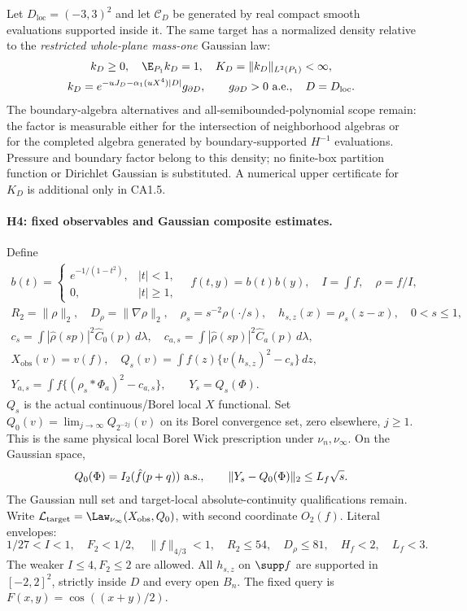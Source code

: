 Let $D_{\mathrm{loc}}=(-3,3)^2$ and let $\mathcal C_D$ be generated by real
compact smooth evaluations supported inside it. The same target has a
normalized density relative to the \emph{restricted whole-plane mass-one}
Gaussian law:
\begin{gather*}
 k_D\ge0,\quad \E_{P_1}k_D=1,\quad K_D=\|k_D\|_{L^2(P_1)}<\infty,\\
 k_D=e^{-uJ_D-\alpha_1(uX^4)|D|}g_{\partial D},\qquad
 g_{\partial D}>0\ \hbox{a.e.},\quad D=D_{\mathrm{loc}}.
\end{gather*}
The boundary-algebra alternatives and all-semibounded-polynomial scope
remain: the factor is measurable either for the intersection of neighborhood
algebras or for the completed algebra generated by boundary-supported
$H^{-1}$ evaluations. Pressure and boundary factor belong to this density;
no finite-box partition function or Dirichlet Gaussian is substituted.
A numerical upper certificate for $K_D$ is additional only in CA1.5.

\paragraph{H4: fixed observables and Gaussian composite estimates.}
Define
\begin{gather*}
 b(t)=\begin{cases}e^{-1/(1-t^2)},&|t|<1,\\0,&|t|\ge1,\end{cases}\quad
 f(t,y)=b(t)b(y),\quad I=\int f,\quad\rho=f/I,\\
 R_2=\|\rho\|_2,\quad D_\rho=\|\nabla\rho\|_2,\quad
 \rho_s=s^{-2}\rho(\cdot/s),\quad h_{s,z}(x)=\rho_s(z-x),\quad0<s\le1,\\
 c_s=\int|\hat\rho(sp)|^2\hat C_0(p)\,d\lambda,\quad
 c_{a,s}=\int|\hat\rho(sp)|^2\hat C_a(p)\,d\lambda,\\
 X_{\mathrm{obs}}(v)=v(f),\quad
 Q_s(v)=\int f(z)\{v(h_{s,z})^2-c_s\}\,dz,\\
 Y_{a,s}=\int f\{(\rho_s*\Phi_a)^2-c_{a,s}\},\qquad Y_s=Q_s(\Phi).
\end{gather*}
$Q_s$ is the actual continuous/Borel local $X$ functional. Set
$Q_0(v)=\lim_{j\to\infty}Q_{2^{-2j}}(v)$ on its Borel convergence set,
zero elsewhere, $j\ge1$. This is the same physical local Borel Wick
prescription under $\nu_n,\nu_\infty$. On the Gaussian space,
\[
 Q_0(\Phi)=I_2(\hat f(p+q))\ \hbox{a.s.},\qquad
 \|Y_s-Q_0(\Phi)\|_2\le L_f\sqrt s.
\]
The Gaussian null set and target-local absolute-continuity qualifications
remain. Write $\mathcal L_{\mathrm{target}}=\Law_{\nu_\infty}
(X_{\mathrm{obs}},Q_0)$, with second coordinate $O_2(f)$. Literal envelopes:
\[
 1/27<I<1,\quad F_2<1/2,\quad\|f\|_{4/3}<1,\quad
 R_2\le54,\quad D_\rho\le81,\quad H_f<2,\quad L_f<3.
\]
The weaker $I\le4,F_2\le2$ are allowed. All $h_{s,z}$ on $\supp f$ are
supported in $[-2,2]^2$, strictly inside $D$ and every open $B_n$.
The fixed query is $F(x,y)=\cos((x+y)/2)$.

